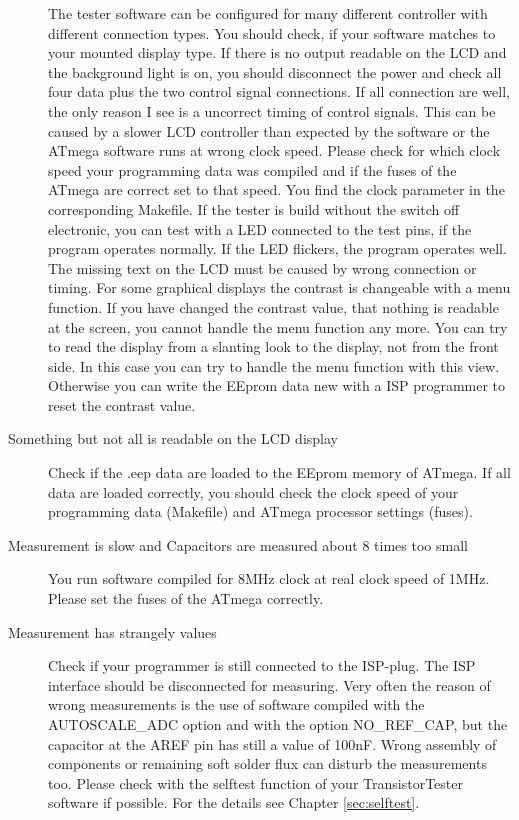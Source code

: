 \begin{description}
The tester software can be configured for many different controller with different connection
types. You should check, if your software matches to your mounted display type.
If there is no output readable on the LCD and the background light is on,
you should disconnect the power and check all four data plus the two control signal connections.
If all connection are well, the only reason I see is a uncorrect timing of
control signals. This can be caused by a slower LCD controller than expected by
the software or the ATmega software runs at wrong clock speed. Please check for which
clock speed your programming data was compiled  and if the fuses of the
ATmega are correct set to that speed. You find the clock parameter in the corresponding
Makefile.
If the tester is build without the switch off electronic, you can test with
a LED connected to the test pins, if the program operates normally.
If the LED flickers, the program operates well. The missing text on the
LCD must be caused by wrong connection or timing.
For some graphical displays the contrast is changeable with a menu function.
If you have changed the contrast value, that nothing is readable at the screen,
you cannot handle the menu function any more. You can try to read the display
from a slanting look to the display, not from the front side.
In this case you can try to handle the menu function with this view.
Otherwise you can write the EEprom data new with a ISP programmer to reset the contrast value.


\item[Something but not all is readable on the LCD display]
Check if the .eep data are loaded to the EEprom memory of ATmega.
If all data are loaded correctly, you should check the clock speed of your
programming data (Makefile) and ATmega processor settings (fuses).

\item[Measurement is slow and Capacitors are measured about 8 times too small]
You run software compiled for 8MHz clock at real clock speed of 1MHz.
Please set the fuses of the ATmega correctly.

\item[Measurement has strangely values]
Check if your programmer is still connected to the ISP-plug.
The ISP interface should be disconnected for measuring.
Very often the reason of wrong measurements is the use of software compiled with
the AUTOSCALE\_ADC option and with the option NO\_REF\_CAP, but the capacitor
at the AREF pin has still a value of 100nF.
Wrong assembly of components or remaining soft solder flux can disturb the 
measurements too. Please check with the selftest function of your TransistorTester software
if possible. For the details see Chapter \ref{sec:selftest}.


\end{description}
